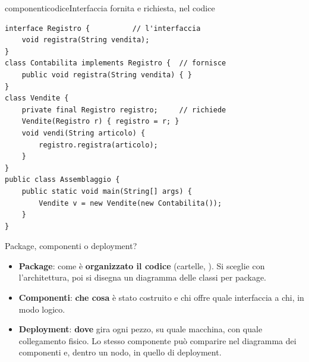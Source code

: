 \begin{caso}{componenticodice}{Interfaccia fornita e richiesta, nel codice}
\begin{lstlisting}[style=javacs]
interface Registro {          // l'interfaccia
    void registra(String vendita);
}
class Contabilita implements Registro {  // fornisce
    public void registra(String vendita) { }
}
class Vendite {
    private final Registro registro;     // richiede
    Vendite(Registro r) { registro = r; }
    void vendi(String articolo) {
        registro.registra(articolo);
    }
}
public class Assemblaggio {
    public static void main(String[] args) {
        Vendite v = new Vendite(new Contabilita());
    }
}
\end{lstlisting}
\tcblower
{}
\end{caso}

\begin{attenzione}{Package, componenti o deployment?}
\begin{itemize}[nosep, leftmargin=*]
  \item \textbf{Package}: come è \textbf{organizzato il codice} (cartelle, ). Si sceglie con l'architettura,
        poi si disegna un diagramma delle classi per package.
  \item \textbf{Componenti}: \textbf{che cosa} è stato costruito e chi offre quale interfaccia a chi, in modo logico.
  \item \textbf{Deployment}: \textbf{dove} gira ogni pezzo, su quale macchina, con quale collegamento fisico. Lo stesso
        componente può comparire nel diagramma dei componenti e, dentro un nodo, in quello di deployment.
\end{itemize}
\end{attenzione}
